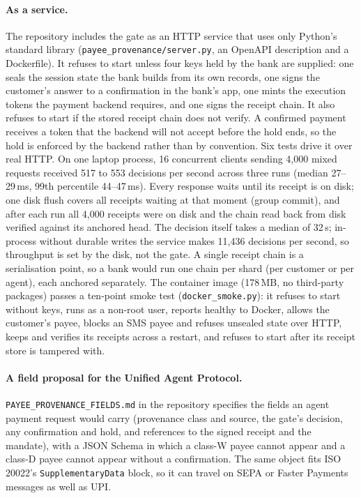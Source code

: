 \paragraph{As a service.} The repository includes the gate as an HTTP service that uses only Python's standard library
(\texttt{payee\_provenance/server.py}, an OpenAPI description and a Dockerfile). It refuses to start unless four keys
held by the bank are supplied: one seals the session state the bank builds from its own records, one signs the customer's
answer to a confirmation in the bank's app, one mints the execution tokens the payment backend requires, and one signs
the receipt chain. It also refuses to start if the stored receipt chain does not verify. A confirmed payment receives a
token that the backend will not accept before the hold ends, so the hold is enforced by the backend rather than by
convention. Six tests drive it over real HTTP. On one laptop process, 16 concurrent clients sending 4,000 mixed requests
received 517 to 553 decisions per second across three runs (median 27--29\,ms, 99th percentile 44--47\,ms). Every
response waits until its receipt is on disk; one disk flush covers all receipts waiting at that moment (group commit),
and after each run all 4,000 receipts were on disk and the chain read back from disk verified against its anchored head.
The decision itself takes a median of 32\,\textmu s; in-process without durable writes the service makes 11,436
decisions per second, so throughput is set by the disk, not the gate. A single receipt chain is a serialisation point,
so a bank would run one chain per shard (per customer or per agent), each anchored separately. The container image
(178\,MB, no third-party packages) passes a ten-point smoke test (\texttt{docker\_smoke.py}): it refuses to start without
keys, runs as a non-root user, reports healthy to Docker, allows the customer's payee, blocks an SMS payee and refuses
unsealed state over HTTP, keeps and verifies its receipts across a restart, and refuses to start after its receipt store
is tampered with.

\paragraph{A field proposal for the Unified Agent Protocol.} \texttt{PAYEE\_PROVENANCE\_FIELDS.md} in the repository
specifies the fields an agent payment request would carry (provenance class and source, the gate's decision, any
confirmation and hold, and references to the signed receipt and the mandate), with a JSON Schema in which a class-W payee
cannot appear and a class-D payee cannot appear without a confirmation. The same object fits ISO 20022's
\texttt{SupplementaryData} block, so it can travel on SEPA or Faster Payments messages as well as UPI.

